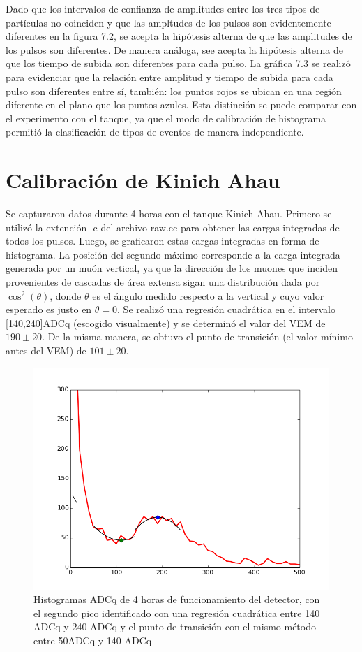 \documentclass{book}
\begin{document}
Dado que los intervalos de confianza de amplitudes entre los tres tipos de part\'iculas no coinciden y que las ampltudes de los pulsos son evidentemente diferentes en la figura 7.2, se acepta la hip\'otesis alterna de que las amplitudes de los pulsos son diferentes. De manera an\'aloga, see acepta la hip\'otesis alterna de que los tiempo de subida son diferentes para cada pulso. La gr\'afica 7.3 se realiz\'o para evidenciar que la relaci\'on entre amplitud y tiempo de subida para cada pulso son diferentes entre s\'i, tambi\'en: los puntos rojos se ubican en una regi\'on diferente en el plano que los puntos azules. Esta distinci\'on se puede comparar con el experimento con el tanque, ya que el modo de calibraci\'on de histograma permiti\'o la clasificaci\'on de tipos de eventos de manera independiente.

\section{Calibraci\'on de Kinich Ahau}
Se capturaron datos durante 4 horas con el tanque Kinich Ahau. Primero se utiliz\'o la extenci\'on -c del archivo raw.cc para obtener las cargas integradas de todos los pulsos. Luego, se graficaron estas cargas integradas en forma de histograma. La posici\'on del segundo m\'aximo corresponde a la carga integrada generada por un mu\'on vertical, ya que la direcci\'on de los muones que inciden provenientes de cascadas de \'area extensa sigan una distribuci\'on dada por $\cos^2(\theta)$, donde $\theta$ es el \'angulo medido respecto a la vertical y cuyo valor esperado es justo en $\theta=0$. Se realiz\'o una regresi\'on cuadr\'atica en el intervalo [140,240]ADCq (escogido visualmente) y se determin\'o el valor del VEM de $190 \pm 20$. De la misma manera, se obtuvo el punto de transici\'on (el valor m\'inimo antes del VEM) de $101\pm20$.

\begin{figure}[h] %
\begin{center}
 \includegraphics[width=0.7\linewidth]{ADCqCorrida1.png}
\caption{Histogramas ADCq de 4 horas de funcionamiento del detector, con el segundo pico identificado con una regresi\'on cuadr\'atica entre 140 ADCq y 240 ADCq y el punto de transici\'on con el mismo m\'etodo entre 50ADCq y 140 ADCq}
\end{center}
\end{figure}
\end{document}
